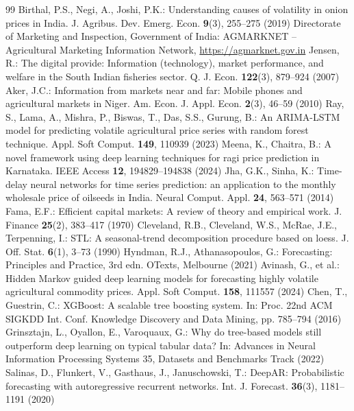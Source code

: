 \documentclass[runningheads]{llncs}
\begin{document}
\begin{thebibliography}{99}
 Birthal, P.S., Negi, A., Joshi, P.K.: Understanding causes of volatility in onion prices in India. J. Agribus. Dev. Emerg. Econ. \textbf{9}(3), 255--275 (2019)
 Directorate of Marketing and Inspection, Government of India: AGMARKNET -- Agricultural Marketing Information Network, \url{https://agmarknet.gov.in}
 Jensen, R.: The digital provide: Information (technology), market performance, and welfare in the South Indian fisheries sector. Q. J. Econ. \textbf{122}(3), 879--924 (2007)
 Aker, J.C.: Information from markets near and far: Mobile phones and agricultural markets in Niger. Am. Econ. J. Appl. Econ. \textbf{2}(3), 46--59 (2010)
 Ray, S., Lama, A., Mishra, P., Biswas, T., Das, S.S., Gurung, B.: An ARIMA-LSTM model for predicting volatile agricultural price series with random forest technique. Appl. Soft Comput. \textbf{149}, 110939 (2023)
 Meena, K., Chaitra, B.: A novel framework using deep learning techniques for ragi price prediction in Karnataka. IEEE Access \textbf{12}, 194829--194838 (2024)
 Jha, G.K., Sinha, K.: Time-delay neural networks for time series prediction: an application to the monthly wholesale price of oilseeds in India. Neural Comput. Appl. \textbf{24}, 563--571 (2014)
 Fama, E.F.: Efficient capital markets: A review of theory and empirical work. J. Finance \textbf{25}(2), 383--417 (1970)
 Cleveland, R.B., Cleveland, W.S., McRae, J.E., Terpenning, I.: STL: A seasonal-trend decomposition procedure based on loess. J. Off. Stat. \textbf{6}(1), 3--73 (1990)
 Hyndman, R.J., Athanasopoulos, G.: Forecasting: Principles and Practice, 3rd edn. OTexts, Melbourne (2021)
 Avinash, G., et al.: Hidden Markov guided deep learning models for forecasting highly volatile agricultural commodity prices. Appl. Soft Comput. \textbf{158}, 111557 (2024)
 Chen, T., Guestrin, C.: XGBoost: A scalable tree boosting system. In: Proc. 22nd ACM SIGKDD Int. Conf. Knowledge Discovery and Data Mining, pp. 785--794 (2016)
 Grinsztajn, L., Oyallon, E., Varoquaux, G.: Why do tree-based models still outperform deep learning on typical tabular data? In: Advances in Neural Information Processing Systems 35, Datasets and Benchmarks Track (2022)
 Salinas, D., Flunkert, V., Gasthaus, J., Januschowski, T.: DeepAR: Probabilistic forecasting with autoregressive recurrent networks. Int. J. Forecast. \textbf{36}(3), 1181--1191 (2020)

\end{thebibliography}
\end{document}
